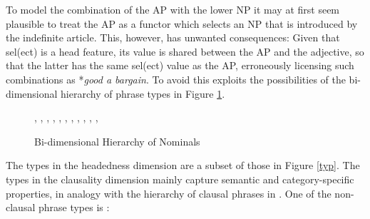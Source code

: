 \documentclass[output=paper]{langsci/langscibook}
\begin{document}
To model the combination of the AP with the lower NP it may at first seem 
plausible to treat the AP as a functor which selects  
an NP that is introduced by the indefinite article. This, however, has 
unwanted consequences: Given that {\sc sel(ect)} is a {\sc head} feature, 
its value is shared between the AP and the adjective, so that the latter 
has the same {\sc sel(ect)} value as the AP, erroneously licensing such 
combinations as *\emph{good a bargain}. To avoid this 
\citet{VanEynde18} exploits the possibilities of 
the bi-dimensional hierarchy of phrase types in Figure \ref{prot}. 

\begin{figure}
\begin{center} 
\footnotesize
\tree
    {,
      {, 
        {,
          {,
            {,
              {}}, 
            {}}}},
      {,
        {,
          {,
            {,
              {}}}}}}
\caption{ \label{prot} Bi-dimensional Hierarchy of Nominals} 
\normalsize
\end{center} 
\end{figure}

The types in the {\sc headedness} dimension are a subset of those in Figure \ref{typ}.  
The types in the {\sc clausality} dimension mainly capture semantic and 
category-specific properties, in analogy with the hierarchy of clausal phrases 
in \citet{GS00}. One of the non-clausal phrase types is : 
\end{document}
